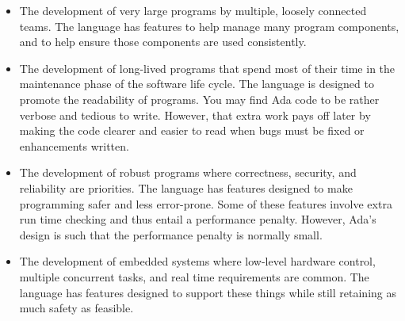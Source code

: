 \begin{itemize}
\item The development of very large programs by multiple, loosely connected teams. The language
  has features to help manage many program components, and to help ensure those components are
  used consistently.

\item The development of long-lived programs that spend most of their time in the maintenance
  phase of the software life cycle. The language is designed to promote the readability of
  programs. You may find Ada code to be rather verbose and tedious to write. However, that extra
  work pays off later by making the code clearer and easier to read when bugs must be fixed or
  enhancements written.

\item The development of robust programs where correctness, security, and reliability are
  priorities. The language has features designed to make programming safer and less error-prone.
  Some of these features involve extra run time checking and thus entail a performance penalty.
  However, Ada's design is such that the performance penalty is normally small.

\item The development of embedded systems where low-level hardware control, multiple concurrent
  tasks, and real time requirements are common. The language has features designed to support
  these things while still retaining as much safety as feasible.
\end{itemize}


















